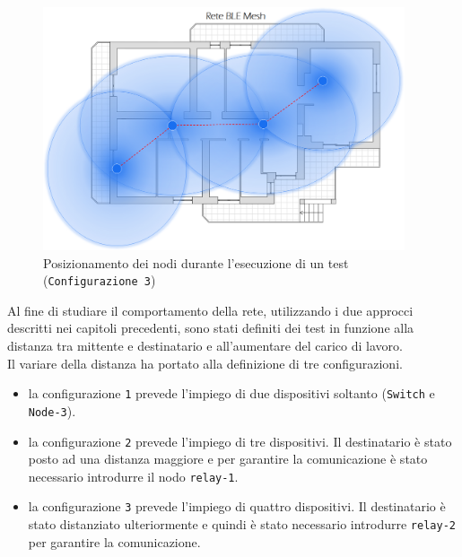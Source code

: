 \begin{figure}[!ht]
    \centering
    \includegraphics[width = 0.95\textwidth]{images/Rete_mesh_.png}
    \caption{Posizionamento dei nodi durante l'esecuzione di un test (\texttt{Configurazione 3})}
    \label{fig:rete_mesh}
\end{figure}

\noindent Al fine di studiare il comportamento della rete, utilizzando i due approcci descritti nei capitoli precedenti, sono stati definiti dei test in funzione alla distanza tra mittente e destinatario e all'aumentare del carico di lavoro.\\
Il variare della distanza ha portato alla definizione di tre configurazioni.
\begin{itemize}
    \item la configurazione \texttt{1} prevede l'impiego di due dispositivi soltanto (\texttt{Switch} e \texttt{Node-3}).
    \item la configurazione \texttt{2} prevede l'impiego di tre dispositivi. Il destinatario è stato posto ad una distanza maggiore e per garantire la comunicazione è stato necessario introdurre il nodo \texttt{relay-1}.
    \item la configurazione \texttt{3} prevede l'impiego di quattro dispositivi. Il destinatario è stato distanziato ulteriormente e quindi è stato necessario introdurre \texttt{relay-2} per garantire la comunicazione.
\end{itemize}

